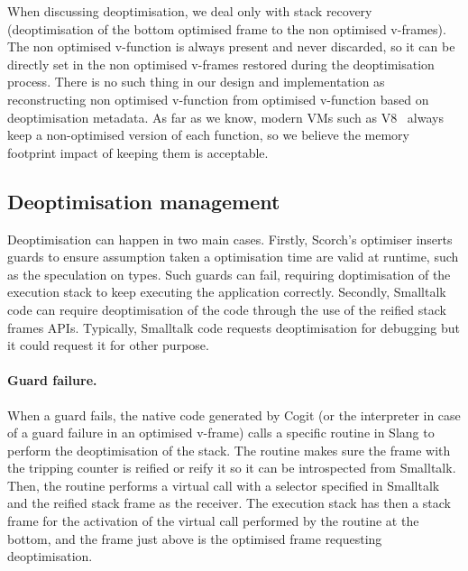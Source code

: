 \documentclass[a4paper,12pt,twoside]{../includes/ThesisStyle}
\begin{document}
When discussing deoptimisation, we deal only with stack recovery (deoptimisation of the bottom optimised frame to the non optimised v-frames). The non optimised v-function is always present and never discarded, so it can be directly set in the non optimised v-frames restored during the deoptimisation process. There is no such thing in our design and implementation as reconstructing non optimised v-function from optimised v-function based on deoptimisation metadata. As far as we know, modern VMs such as V8~\cite{V8} always keep a non-optimised version of each function, so we believe the memory footprint impact of keeping them is acceptable.

\subsection{Deoptimisation management}

Deoptimisation can happen in two main cases. Firstly, Scorch's optimiser inserts guards to ensure assumption taken a optimisation time are valid at runtime, such as the speculation on types. Such guards can fail, requiring doptimisation of the execution stack to keep executing the application correctly. Secondly, Smalltalk code can require deoptimisation of the code through the use of the reified stack frames APIs. Typically, Smalltalk code requests deoptimisation for debugging but it could request it for other purpose.

\paragraph{Guard failure.} When a guard fails, the native code generated by Cogit (or the interpreter in case of a guard failure in an optimised v-frame) calls a specific routine in Slang to perform the deoptimisation of the stack. The routine makes sure the frame with the tripping counter is reified or reify it so it can be introspected from Smalltalk. Then, the routine performs a virtual call with a selector specified in Smalltalk and the reified stack frame as the receiver. The execution stack has then a stack frame for the activation of the virtual call performed by the routine at the bottom, and the frame just above is the optimised frame requesting deoptimisation. 
\end{document}
